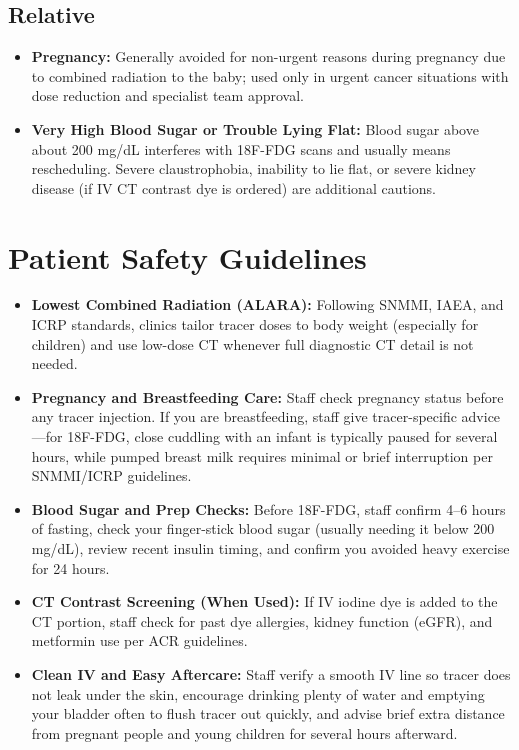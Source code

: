 \subsection{Relative}

\begin{itemize}
    \item \textbf{Pregnancy:} Generally avoided for non-urgent reasons during pregnancy due to combined radiation to the baby; used only in urgent cancer situations with dose reduction and specialist team approval.
    \item \textbf{Very High Blood Sugar or Trouble Lying Flat:} Blood sugar above about 200 mg/dL interferes with 18F-FDG scans and usually means rescheduling. Severe claustrophobia, inability to lie flat, or severe kidney disease (if IV CT contrast dye is ordered) are additional cautions.
\end{itemize}

\section{Patient Safety Guidelines}

\begin{itemize}
    \item \textbf{Lowest Combined Radiation (ALARA):} Following SNMMI, IAEA, and ICRP standards, clinics tailor tracer doses to body weight (especially for children) and use low-dose CT whenever full diagnostic CT detail is not needed.
    \item \textbf{Pregnancy and Breastfeeding Care:} Staff check pregnancy status before any tracer injection. If you are breastfeeding, staff give tracer-specific advice---for 18F-FDG, close cuddling with an infant is typically paused for several hours, while pumped breast milk requires minimal or brief interruption per SNMMI/ICRP guidelines.
    \item \textbf{Blood Sugar and Prep Checks:} Before 18F-FDG, staff confirm 4--6 hours of fasting, check your finger-stick blood sugar (usually needing it below 200 mg/dL), review recent insulin timing, and confirm you avoided heavy exercise for 24 hours.
    \item \textbf{CT Contrast Screening (When Used):} If IV iodine dye is added to the CT portion, staff check for past dye allergies, kidney function (eGFR), and metformin use per ACR guidelines.
    \item \textbf{Clean IV and Easy Aftercare:} Staff verify a smooth IV line so tracer does not leak under the skin, encourage drinking plenty of water and emptying your bladder often to flush tracer out quickly, and advise brief extra distance from pregnant people and young children for several hours afterward.
\end{itemize}

